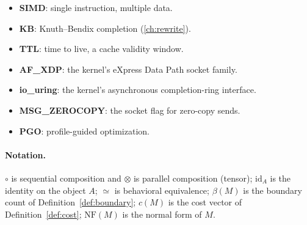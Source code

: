 \begin{itemize}
  by HTTP/3.
\item \textbf{SIMD}: single instruction, multiple data.
\item \textbf{KB}: Knuth--Bendix completion (\autoref{ch:rewrite}).
\item \textbf{TTL}: time to live, a cache validity window.
\item \textbf{AF\_XDP}: the kernel's eXpress Data Path socket family.
\item \textbf{io\_uring}: the kernel's asynchronous completion-ring
  interface.
\item \textbf{MSG\_ZEROCOPY}: the socket flag for zero-copy sends.
\item \textbf{PGO}: profile-guided optimization.
\end{itemize}

\paragraph{Notation.}
$\circ$ is sequential composition and $\otimes$ is parallel
composition (tensor); $\mathrm{id}_A$ is the identity on the object
$A$; $\simeq$ is behavioral equivalence; $\beta(M)$ is the boundary
count of Definition~\ref{def:boundary}; $c(M)$ is the cost vector of
Definition~\ref{def:cost}; $\mathrm{NF}(M)$ is the normal form of $M$.
